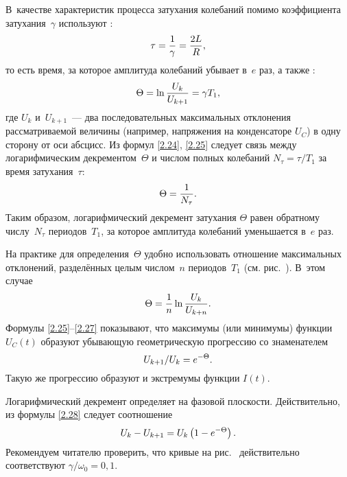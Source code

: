 В~качестве характеристик процесса затухания колебаний помимо коэффициента
затухания~$\gamma$ используют :
\begin{equation}\eqmark{2.24}
	\tau=\frac1\gamma=\frac{2L}{R},
\end{equation}
то есть время, за которое амплитуда колебаний убывает в~$e$ раз, а также
:
\begin{equation}\eqmark{2.25}
	\Theta=\ln\dfrac{U_{k}}{U_{k+1}}=\gamma T_1,
\end{equation}
где $U_{k}$ и~$U_{k+1}$~--- два последовательных максимальных отклонения
рассматриваемой величины (например, напряжения на конденсаторе $U_C$) в одну
сторону от оси абсцисс. Из формул \eqref{2.24}, \eqref{2.25} следует связь между
логарифмическим декрементом~$\Theta$ и числом полных колебаний $N_{\tau}=\tau/T_1$ за
время затухания~$\tau$:
\begin{equation}\eqmark{2.26}
\Theta=\frac{1}{N_{\tau}}.
\end{equation}
Таким образом, логарифмический декремент затухания $\Theta$ равен обратному
числу~$N_{\tau}$ периодов~$T_1$, за которое амплитуда колебаний уменьшается в~$e$ раз.

На практике для определения~$\Theta$ удобно использовать отношение максимальных
отклонений, разделённых целым числом~$n$ периодов~$T_1$ (см.
рис.~). В~этом случае
\begin{equation}\eqmark{2.27}
\Theta=\dfrac{1}{n}\ln\dfrac{U_{k}}{U_{k+n}}.
\end{equation}
Формулы \eqref{2.25}--\eqref{2.27} показывают, что максимумы (или минимумы)
функции $U_C(t)$ образуют убывающую геометрическую прогрессию со знаменателем
\begin{equation}\eqmark{2.28}
U_{k+1}/U_{k}=e^{-\Theta}.
\end{equation}
Такую же прогрессию образуют и экстремумы функции $I(t)$.

Логарифмический декремент определяет  на фазовой плоскости. Действительно, из формулы \eqref{2.28} следует 
соотношение
\begin{equation}\eqmark{2.29}
	U_{k}-U_{k+1}=U_{k}\left(1-e^{-\Theta}\right).
\end{equation}
Рекомендуем читателю проверить, что кривые на рис.~ 
действительно соответствуют $\gamma/\omega_0=0,1$.

